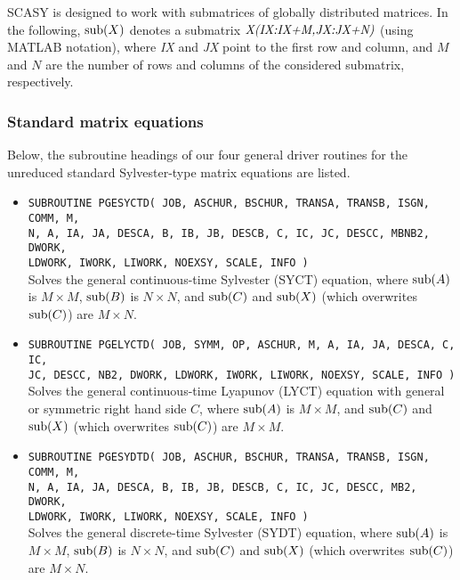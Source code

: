 \documentclass[11pt]{article}
\begin{document}
SCASY is designed to work with submatrices of globally distributed
matrices. In the following, ${\rm sub}(X)$ denotes a submatrix
$\mbox{\em X(IX:IX+M,JX:JX+N)}$ (using {\sc MATLAB} notation),
where {\em IX} and {\em JX} point to the first row and column, and
$M$ and $N$ are the number of rows and columns of the considered
submatrix, respectively.

\subsubsection{Standard matrix equations}
Below, the subroutine headings of our four general driver routines
for the unreduced standard Sylvester-type matrix equations are
listed.

\begin{itemize}
\item \texttt{SUBROUTINE PGESYCTD( JOB, ASCHUR, BSCHUR, TRANSA,
TRANSB, ISGN, COMM, M, \\ N, A, IA, JA, DESCA, B, IB, JB, DESCB,
C, IC, JC, DESCC, MBNB2, DWORK, \\ LDWORK, IWORK, LIWORK, NOEXSY, SCALE, INFO )} \\
Solves the general continuous-time Sylvester (SYCT) equation,
where ${\rm sub}(A)$ is $M \times M$, ${\rm sub}(B)$ is $N \times
N$, and ${\rm sub}(C)$ and ${\rm sub}(X)$ (which overwrites ${\rm
sub}(C)$) are $M \times N$. \\

 \item \texttt{SUBROUTINE PGELYCTD( JOB, SYMM, OP, ASCHUR, M, A, IA, JA, DESCA,
C, IC, \\ JC, DESCC, NB2, DWORK, LDWORK, IWORK, LIWORK, NOEXSY, SCALE, INFO ) } \\
Solves the general continuous-time Lyapunov (LYCT) equation with
general or symmetric right hand side $C$, where ${\rm sub}(A)$ is
$M \times M$, and ${\rm sub}(C)$ and ${\rm sub}(X)$ (which
overwrites ${\rm
sub}(C)$) are $M \times M$. \\

\item \texttt{SUBROUTINE PGESYDTD( JOB, ASCHUR, BSCHUR, TRANSA,
TRANSB, ISGN, COMM, M, \\ N, A, IA, JA, DESCA, B, IB, JB, DESCB,
C, IC, JC, DESCC, MB2, DWORK, \\ LDWORK, IWORK, LIWORK, NOEXSY, SCALE, INFO )} \\
Solves the general discrete-time Sylvester (SYDT) equation, where
${\rm sub}(A)$ is $M \times M$, ${\rm sub}(B)$ is $N \times N$,
and ${\rm sub}(C)$ and ${\rm sub}(X)$ (which overwrites ${\rm
sub}(C)$) are $M \times N$. \\


\end{itemize}
\end{document}
